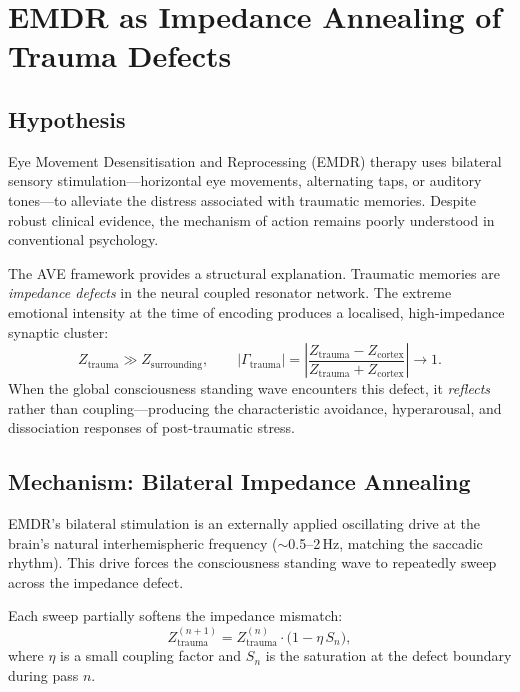 \section{EMDR as Impedance Annealing of Trauma Defects}
\label{sec:emdr}

\subsection{Hypothesis}

Eye Movement Desensitisation and Reprocessing (EMDR) therapy uses
bilateral sensory stimulation---horizontal eye movements, alternating
taps, or auditory tones---to alleviate the distress associated with
traumatic memories.  Despite robust clinical evidence, the
mechanism of action remains poorly understood in conventional
psychology.

The AVE framework provides a structural explanation.  Traumatic
memories are \emph{impedance defects} in the neural coupled
resonator network.  The extreme emotional intensity at the time
of encoding produces a localised, high-impedance synaptic
cluster:
\begin{equation}
  Z_{\mathrm{trauma}} \gg Z_{\mathrm{surrounding}},
  \qquad
  |\Gamma_{\mathrm{trauma}}|
  = \left|\frac{Z_{\mathrm{trauma}} - Z_{\mathrm{cortex}}}
               {Z_{\mathrm{trauma}} + Z_{\mathrm{cortex}}}
  \right| \to 1.
\end{equation}
When the global consciousness standing wave encounters this defect,
it \emph{reflects} rather than coupling---producing the
characteristic avoidance, hyperarousal, and dissociation responses
of post-traumatic stress.

\subsection{Mechanism: Bilateral Impedance Annealing}

EMDR's bilateral stimulation is an externally applied oscillating
drive at the brain's natural interhemispheric frequency
($\sim$0.5--2\,Hz, matching the saccadic rhythm).  This drive
forces the consciousness standing wave to repeatedly sweep across
the impedance defect.

Each sweep partially softens the impedance mismatch:
\begin{equation}
  Z_{\mathrm{trauma}}^{(n+1)}
  = Z_{\mathrm{trauma}}^{(n)} \cdot
    \bigl(1 - \eta\,S_n\bigr),
\end{equation}
where $\eta$ is a small coupling factor and $S_n$ is the
saturation at the defect boundary during pass $n$.


